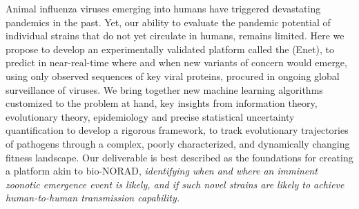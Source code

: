 \documentclass[onecolumn, compsoc,10pt]{IEEEtran}
\begin{document}
\pagestyle{empty}


{\bf  \TITLE}

Animal influenza  viruses emerging into humans %
have triggered devastating  pandemics in the past. Yet, our ability to evaluate the pandemic potential of individual strains that do not yet circulate in humans, remains limited. Here we propose to develop an experimentally  validated platform called the \enet (Enet), to predict in near-real-time where and when  new variants of concern would emerge,  using only observed  sequences  of key viral proteins, procured in ongoing global surveillance of \infl viruses. We bring together new machine learning algorithms customized to the problem at hand, key insights from information theory, evolutionary theory, epidemiology and precise statistical  uncertainty quantification to develop a rigorous framework, to  track evolutionary trajectories of pathogens through a complex, poorly characterized, and dynamically changing fitness landscape. Our deliverable is best described as the foundations for creating a platform akin to bio-NORAD,  \textit{identifying when and where an imminent zoonotic emergence event is likely, and if such novel strains are likely to achieve human-to-human transmission capability.}



\end{document}
